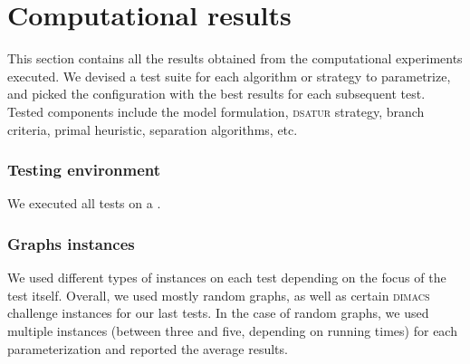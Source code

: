 
\section{Computational results}
\label{sec:results}

This section contains all the results obtained from the computational experiments executed. We devised a test suite for each algorithm or strategy to parametrize, and picked the configuration with the best results for each subsequent test. Tested components include the model formulation, \textsc{dsatur} strategy, branch criteria, primal heuristic, separation algorithms, etc.

\subsubsection*{Testing environment}

We executed all tests on a .

\subsubsection*{Graphs instances}

We used different types of instances on each test depending on the focus of the test itself. Overall, we used mostly random graphs, as well as certain \textsc{dimacs} challenge instances\cite{dimacs} for our last tests. In the case of random graphs, we used multiple instances (between three and five, depending on running times) for each parameterization and reported the average results.  

